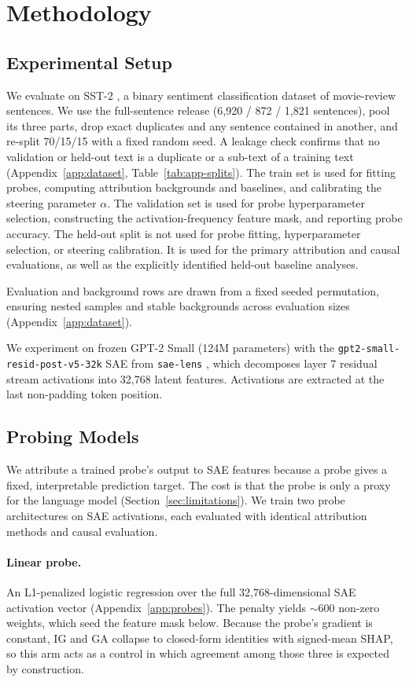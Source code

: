 \section{Methodology}
\subsection{Experimental Setup}
We evaluate on SST-2 \citep{socher2013recursive}, a binary sentiment classification dataset of movie-review sentences. We use the full-sentence release (6{,}920 / 872 / 1{,}821 sentences), pool its three parts, drop exact duplicates and any sentence contained in another, and re-split 70/15/15 with a fixed random seed. A leakage check confirms that no validation or held-out text is a duplicate or a sub-text of a training text (Appendix~\ref{app:dataset}, Table~\ref{tab:app-splits}). The train set is used for fitting probes, computing attribution backgrounds and baselines, and calibrating the steering parameter $\alpha$. The validation set is used for probe hyperparameter selection, constructing the activation-frequency feature mask, and reporting probe accuracy. The held-out split is not used for probe fitting, hyperparameter selection, or steering calibration. It is used for the primary attribution and causal evaluations, as well as the explicitly identified held-out baseline analyses.

Evaluation and background rows are drawn from a fixed seeded permutation, ensuring nested samples and stable backgrounds across evaluation sizes (Appendix~\ref{app:dataset}).

We experiment on frozen GPT-2 Small (124M parameters) \citep{radford2019language} with the \verb|gpt2-small-resid-post-v5-32k| SAE from \verb|sae-lens| \citep{gao2025scaling}, which decomposes layer 7 residual stream activations into 32,768 latent features. Activations are extracted at the last non-padding token position.

\subsection{Probing Models}
We attribute a trained probe’s output to SAE features because a probe gives a fixed, interpretable prediction target. The cost is that the probe is only a proxy for the language model (Section~\ref{sec:limitations}). We train two probe architectures on SAE activations, each evaluated with identical attribution methods and causal evaluation.

\paragraph{Linear probe.} An L1-penalized logistic regression over the full 32,768-dimensional SAE activation vector (Appendix~\ref{app:probes}). The penalty yields $\sim$600 non-zero weights, which seed the feature mask below. Because the probe’s gradient is constant, IG and GA collapse to closed-form identities with signed-mean SHAP, so this arm acts as a control in which agreement among those three is expected by construction.

